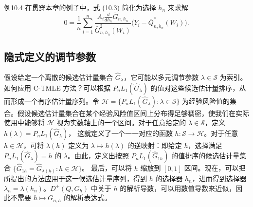\begin{bookresult}{例}{10.4}
在贯穿本章的例子中，式 (10.3) 简化为选择 $h_n$ 来求解
\begin{equation}
 0=\frac1n\sum_{i=1}^n
 \frac{A_i\frac{d}{dh_n}\bar G_{n,h_n}}
      {\bar G_{n,h_n}^2(W_i)}
 \bigl(Y_i-\bar Q_{n,h_n}^*(W_i)\bigr).
 \tag{10.6}
\end{equation}
\end{bookresult}

\subsection{隐式定义的调节参数}
\label{subsec:ch10-implicit-tuning}

假设给定一个离散的候选估计量集合 $\widehat G_\lambda$，它可能以多元调节参数 $\lambda\in\mathcal S$ 为索引。如何应用 C-TMLE 方法？可以根据 $P_nL_1(\widehat G_\lambda)$ 的值对这些候选估计量排序，从而形成一个有序估计量序列。令
$\mathcal H=\{P_nL_1(\widehat G_\lambda):\lambda\in\mathcal S\}$
为经验风险值的集合。假设候选估计量集合在某个经验风险值区间上分布得足够稠密，使我们在实际使用中能够将 $\mathcal H$ 视为实数轴上的一个区间。对于任意给定的 $\lambda\in\mathcal S$，定义
$h(\lambda)=P_nL_1(\widehat G_\lambda)$，
这就定义了一个一一对应的函数 $h:\mathcal S\to\mathcal H$。对于任意 $h\in\mathcal H$，可将 $\lambda(h)$ 定义为 $\lambda\mapsto h(\lambda)$ 的逆映射：即给定 $h$，选择满足 $P_nL_1(\widehat G_\lambda)=h$ 的 $\lambda$。由此，定义出按照 $P_nL_1(\widehat G_{1h})$ 的值排序的候选估计量集合
$\{\widehat G_{1h}=\widehat G_{\lambda(h)}:h\in\mathcal H\}$。
最后，可以将 $h$ 缩放到 $[0,1]$ 区间。现在，可以把所提出的方法应用于这一候选估计量序列，得到 $h$ 的选择器 $h_n$，进而得到选择器 $\lambda_n=\lambda(h_n)$。$D^+(Q,G_h)$ 中关于 $h$ 的解析导数，可以用数值导数来近似，因此不需要 $h\mapsto G_{n,h}$ 的解析表达式。

